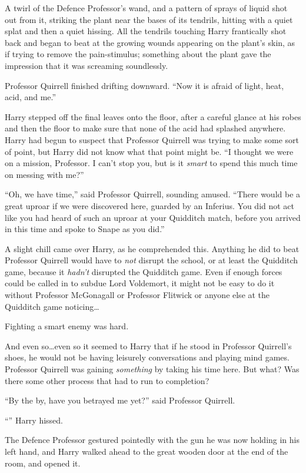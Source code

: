 A twirl of the Defence Professor’s wand, and a pattern of sprays of liquid shot out from it, striking the plant near the bases of its tendrils, hitting with a quiet splat and then a quiet hissing. All the tendrils touching Harry frantically shot back and began to beat at the growing wounds appearing on the plant’s skin, as if trying to remove the pain-stimulus; something about the plant gave the impression that it was screaming soundlessly.

Professor Quirrell finished drifting downward. “Now it is afraid of light, heat, acid, and me.”

Harry stepped off the final leaves onto the floor, after a careful glance at his robes and then the floor to make sure that none of the acid had splashed anywhere. Harry had begun to suspect that Professor Quirrell was trying to make some sort of point, but Harry did not know what that point might be. “I thought we were on a mission, Professor. I can’t stop you, but is it \emph{smart} to spend this much time on messing with me?”

“Oh, we have time,” said Professor Quirrell, sounding amused. “There would be a great uproar if we were discovered here, guarded by an Inferius. You did not act like you had heard of such an uproar at your Quidditch match, before you arrived in this time and spoke to Snape as you did.”

A slight chill came over Harry, as he comprehended this. Anything he did to beat Professor Quirrell would have to \emph{not} disrupt the school, or at least the Quidditch game, because it \emph{hadn’t} disrupted the Quidditch game. Even if enough forces could be called in to subdue Lord Voldemort, it might not be easy to do it without Professor McGonagall or Professor Flitwick or anyone else at the Quidditch game noticing…

Fighting a smart enemy was hard.

And even so…even so it seemed to Harry that if he stood in Professor Quirrell’s shoes, he would not be having leisurely conversations and playing mind games. Professor Quirrell was gaining \emph{something} by taking his time here. But what? Was there some other process that had to run to completion?

“By the by, have you betrayed me yet?” said Professor Quirrell.

“” Harry hissed.

The Defence Professor gestured pointedly with the gun he was now holding in his left hand, and Harry walked ahead to the great wooden door at the end of the room, and opened it.

